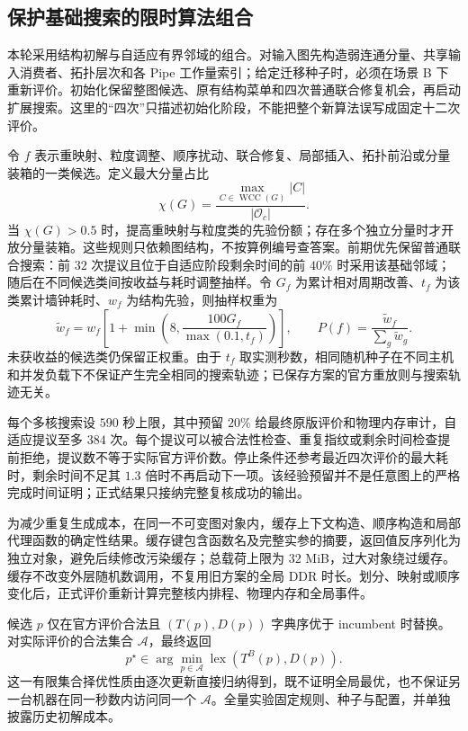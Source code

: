 \subsection{保护基础搜索的限时算法组合}
本轮采用结构初解与自适应有界邻域的组合。对输入图先构造弱连通分量、共享输入消费者、拓扑层次和各 Pipe 工作量索引；给定迁移种子时，必须在场景 B 下重新评价。初始化保留整图候选、原有结构菜单和四次普通联合修复机会，再启动扩展搜索。这里的“四次”只描述初始化阶段，不能把整个新算法误写成固定十二次评价。

令 $f$ 表示重映射、粒度调整、顺序扰动、联合修复、局部插入、拓扑前沿或分量装箱的一类候选。定义最大分量占比
\begin{equation}\label{eq:q2-dominant-ratio}
\chi(G)=\frac{\max_{C\in\operatorname{WCC}(G)}|C|}{|\mathcal O_c|}.
\end{equation}
当 $\chi(G)>0.5$ 时，提高重映射与粒度类的先验份额；存在多个独立分量时才开放分量装箱。这些规则只依赖图结构，不按算例编号查答案。前期优先保留普通联合搜索：前 $32$ 次提议且位于自适应阶段剩余时间的前 $40\%$ 时采用该基础邻域；随后在不同候选类间按收益与耗时调整抽样。令 $G_f$ 为累计相对周期改善、$t_f$ 为该类累计墙钟耗时、$w_f$ 为结构先验，则抽样权重为
\begin{equation}
\widetilde w_f=w_f\left[1+\min\left(8,\frac{100G_f}{\max(0.1,t_f)}\right)\right],\qquad
P(f)=\frac{\widetilde w_f}{\sum_g\widetilde w_g}.
\end{equation}
未获收益的候选类仍保留正权重。由于 $t_f$ 取实测秒数，相同随机种子在不同主机和并发负载下不保证产生完全相同的搜索轨迹；已保存方案的官方重放则与搜索轨迹无关。

每个多核搜索设 $590$ 秒上限，其中预留 $20\%$ 给最终原版评价和物理内存审计，自适应提议至多 $384$ 次。每个提议可以被合法性检查、重复指纹或剩余时间检查提前拒绝，提议数不等于实际官方评价数。停止条件还参考最近四次评价的最大耗时，剩余时间不足其 $1.3$ 倍时不再启动下一项。该经验预留并不是任意图上的严格完成时间证明；正式结果只接纳完整复核成功的输出。

为减少重复生成成本，在同一不可变图对象内，缓存上下文构造、顺序构造和局部代理函数的确定性结果。缓存键包含函数名及完整实参的摘要，返回值反序列化为独立对象，避免后续修改污染缓存；总载荷上限为 $32$ MiB，过大对象绕过缓存。缓存不改变外层随机数调用，不复用旧方案的全局 DDR 时长。划分、映射或顺序变化后，正式评价重新计算完整核内排程、物理内存和全局事件。

候选 $p$ 仅在官方评价合法且 $(T(p),D(p))$ 字典序优于 incumbent 时替换。对实际评价的合法集合 $\mathcal A$，最终返回
\begin{equation}
p^\star\in\arg\min_{p\in\mathcal A}\operatorname{lex}(T^B(p),D(p)).
\end{equation}
这一有限集合择优性质由逐次更新直接归纳得到，既不证明全局最优，也不保证另一台机器在同一秒数内访问同一个 $\mathcal A$。全量实验固定规则、种子与配置，并单独披露历史初解成本。
